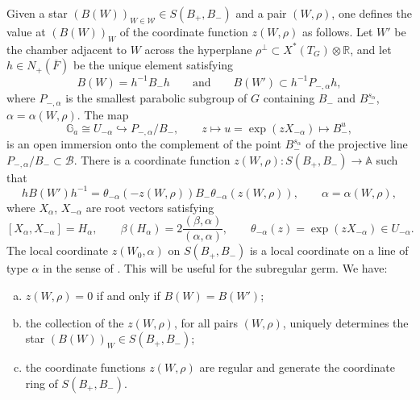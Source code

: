\documentclass[12pt,letterpaper]{amsart}
\theoremstyle{plain}
\theoremstyle{definition}
\theoremstyle{remark}
\theoremstyle{definition}
\newcommand{\ovF}{\overline{F}}
\newcommand{\aaa}{\mathbb{A}}
\newcommand{\rrr}{\mathbb{R}}
\newcommand{\gga}{\mathbb{G}}
\begin{document}
Given a star $(B(W))_{W\in{\mathcal W}}\in S(B_+,B_-)$ and
a pair $(W,\rho)$, one defines
the value at $(B(W))_{W}$ of the coordinate
function $z(W,\rho)$ as follows. Let $W'$ be the chamber adjacent to $W$
across the hyperplane $\rho^\perp\subset X^*(T_G)\otimes {\rrr}$,
and let $h\in N_+(\ovF)$ be the unique element
satisfying
\[
B(W)=h^{-1}B_-h
\qquad\text{and}\qquad
B(W')\subset h^{-1}P_{-,\alpha} h,
\]
where $P_{-,\alpha}$ is the smallest parabolic subgroup
of $G$ containing $B_-$ and $B_-^{s_\alpha}$, $\alpha
=\alpha (W,\rho)$.
The map
\[
\gga_a\cong U_{-\alpha}\hookrightarrow P_{-,\alpha}/B_-,\qquad
z\longmapsto u=\exp(zX_{-\alpha})\longmapsto B_-^u,
\]
is an open immersion onto the complement of the point $B_-^{s_\alpha}$
of the projective line $P_{-,\alpha}/B_-\subset {\mathcal B}$.
There is a coordinate function $z(W,\rho):S(B_+,B_-)\rightarrow \aaa$
such that
\begin{equation}\tag{1.8}\label{eq:1.8}
hB(W')h^{-1}=\theta_{-\alpha} (-z(W,\rho))B_-\theta_{-\alpha} (z(W,\rho)),
\qquad\alpha=\alpha(W,\rho),
\end{equation}
where $X_\alpha$, $X_{-\alpha}$ are root vectors satisfying
\[
[X_\alpha, X_{-\alpha}]=H_\alpha,\qquad
\beta(H_{\alpha})=2\frac{(\beta,\alpha)}{(\alpha,\alpha)},\qquad
\theta_{-\alpha}(z)=\exp(zX_{-\alpha})\in U_{-\alpha}.
\]
The local coordinate $z(W_0,\alpha)$ on $S(B_+,B_-)$ is
a local coordinate on a line of type $\alpha$ in the sense
of \cite{St74}. This will be useful for the subregular germ.
We have:
\begin{enumerate}[(a)]
\item $z(W,\rho)=0$ if and only if $B(W)=B(W')$;
\item the collection of the $z(W,\rho)$, for all pairs $(W,\rho)$,
uniquely determines the star $(B(W))_{W}\in S(B_+,B_-)$;
\item the coordinate functions $z(W,\rho)$ are regular and generate
the coordinate ring of $S(B_+,B_-)$.
\end{enumerate}
\end{document}

